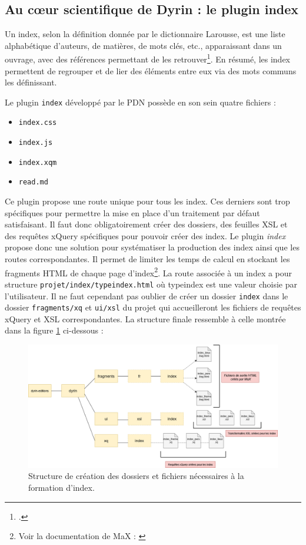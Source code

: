 \documentclass[a4paper,12pt,twoside]{book}
\begin{document}
\subsection{Au c\oe{}ur scientifique de Dyrin : le plugin index}
Un index, selon la définition donnée par le dictionnaire Larousse, est une \og liste alphabétique d'auteurs, de matières, de mots clés, etc., apparaissant dans un ouvrage, avec des références permettant de les retrouver\fg\footcite{larousse}. En résumé, les index permettent de regrouper et de lier des éléments entre eux via des mots communs les définissant.

Le plugin \texttt{index} développé par le \acrshort{PDN} possède en son sein quatre fichiers :
\begin{itemize}
    \item \texttt{index.css}
    \item \texttt{index.js}
    \item \texttt{index.xqm}
    \item \texttt{read.md}
\end{itemize}

Ce plugin propose une route unique pour tous les index. Ces derniers sont trop spécifiques pour permettre la mise en place d'un traitement par défaut satisfaisant. Il faut donc obligatoirement créer des dossiers, des feuilles \acrshort{XSL} et des requêtes xQuery spécifiques pour pouvoir créer des index.
Le plugin \textit{index} propose donc une solution pour systématiser la production des index ainsi que les routes correspondantes.
Il permet de limiter les temps de calcul en stockant les fragments \acrshort{HTML} de chaque page d'index\footnote{Voir la documentation de MaX : \cite{maxdoc}}. La route associée à un index a pour structure \texttt{projet/index/typeindex.html} où \og typeindex \fg{} est une valeur choisie par l'utilisateur. Il ne faut cependant pas oublier de créer un dossier \texttt{index} dans le dossier \texttt{fragments/xq} et \texttt{ui/xsl} du projet qui accueilleront les fichiers de requêtes xQuery et \acrshort{XSL} correspondantes. La structure finale ressemble à celle montrée dans la figure \ref{index} ci-dessous :

\begin{figure}[H]
    \centering
    \includegraphics[width=13cm]{img/partie_3/index.png}
    \caption{Structure de création des dossiers et fichiers nécessaires à la formation d'index.}
    \label{index}
\end{figure}
\end{document}
